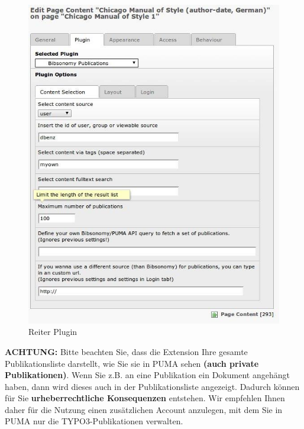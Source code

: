 \begin{figure}[ht]
 \centering
 \includegraphics[scale=0.4]{puma-100}
 \caption{Reiter Plugin}
 \label{figure1}
\end{figure}\newline
\begin{shaded} \centering
\textbf{ACHTUNG:} Bitte beachten Sie, dass die Extension Ihre gesamte Publikationsliste darstellt, wie Sie sie in PUMA sehen \textbf{(auch private Publikationen)}. Wenn Sie z.B. an eine Publikation ein Dokument angehängt haben, dann wird dieses auch in der Publikationsliste angezeigt. Dadurch können für Sie \textbf{urheberrechtliche Konsequenzen} entstehen. Wir empfehlen Ihnen daher für die Nutzung einen zusätzlichen Account anzulegen, mit dem Sie in PUMA nur die TYPO3-Publikationen verwalten.
\end{shaded} 
